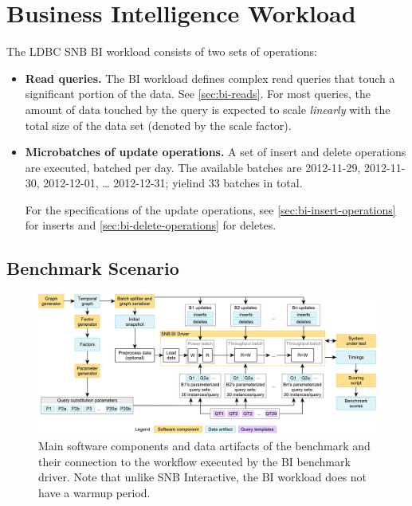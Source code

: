 \chapter{Business Intelligence Workload}
\label{sec:bi}

The LDBC SNB BI workload consists of two sets of operations:

\begin{itemize}

\item \textbf{Read queries.}
The BI workload defines complex read queries that touch a significant portion of the data. See \autoref{sec:bi-reads}.
For most queries, the amount of data touched by the query is expected to scale \emph{linearly} with the total size of the data set (denoted by the scale factor).


\item \textbf{Microbatches of update operations.}
A set of insert and delete operations are executed, batched per day.
The available batches are
2012-11-29,
2012-11-30,
2012-12-01, \ldots
2012-12-31;
yielind 33 batches in total.

For the specifications of the update operations,
see
\autoref{sec:bi-insert-operations} for inserts and
\autoref{sec:bi-delete-operations} for deletes.

\end{itemize}

\section{Benchmark Scenario}
\label{sec:bi-benchmark-scenario}

\begin{figure}[H]
    \centering
    \includegraphics[scale=\yedscale]{figures/bi-workflow}
    \caption{Main software components and data artifacts of the benchmark and their connection to the workflow executed by the BI benchmark driver. Note that unlike SNB Interactive, the BI workload does not have a warmup period.}
    \label{fig:bi-workflow}
\end{figure}

